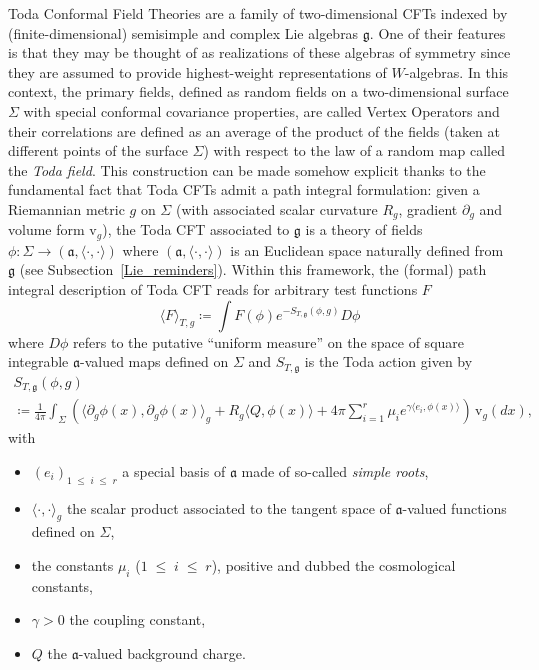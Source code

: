\documentclass[10pt]{amsart}
\theoremstyle{definition}\newtheorem{defi}[theo]{Definition}\newtheorem{rema}[theo]{Remark}\newtheorem{exam}[theo]{Example}\newtheorem{exem}[theo]{Example}\newtheorem{nota}[theo]{Notation}
\renewcommand{\leq}{\;\leqslant\;}
\newcommand{\frkg}{\mathfrak{g}}
\newcommand{\frka}{\mathfrak{a}}
\newcommand{\rmv}{\mathrm{v}}
\begin{document}
Toda Conformal Field Theories are a family of two-dimensional CFTs indexed by (finite-dimensional) semisimple and complex Lie algebras $\frkg$. One of their features is that they may be thought of as realizations of these algebras of symmetry since they are assumed to provide highest-weight representations of $W$-algebras. In this context, the primary fields, defined as random fields on a two-dimensional surface $\Sigma$ with special conformal covariance properties, are called Vertex Operators and their correlations are defined as an average of the product of the fields (taken at different points of the surface $\Sigma$) with respect to the law of a random map called the \emph{Toda field}. This construction can be made somehow explicit thanks to the fundamental fact that Toda CFTs admit a path integral formulation: given a Riemannian metric $g$ on $\Sigma$ (with associated scalar curvature $R_g$, gradient $\partial_g$ and volume form $\rmv_g$), the Toda CFT associated to $\frkg$ is a theory of fields $\phi:\Sigma\to (\frka,\langle \cdot, \cdot \rangle)$ where $(\frka,\langle \cdot, \cdot \rangle)$ is an Euclidean space naturally defined from $\frkg$ (see Subsection~\ref{Lie_reminders}). Within this framework, the (formal) path integral description of Toda CFT reads for arbitrary test functions $F$
\begin{equation}\label{partition_function}
\langle F \rangle_{T,g} \coloneqq \int F(\phi)e^{-S_{T,\frkg}(\phi,g)}D \phi
\end{equation}
where $D \phi$ refers to the putative ``uniform measure'' on the space of square integrable $\frka$-valued maps defined on $\Sigma$ and $ S_{T,\frkg}$ is the Toda action given by
\begin{multline}\label{action}
S_{T,\frkg}(\phi,g)\\
\coloneqq \frac{1}{4\pi} \int_{\Sigma} \left (\langle\partial_g \phi(x), \partial_g \phi(x) \rangle_g +R_g \langle Q, \phi(x) \rangle +4\pi \sum_{i=1}^{r} \mu_ie^{\gamma \langle e_i,\phi(x) \rangle} \right)\,\rmv_{g}(dx),
\end{multline}
with
\begin{itemize}
\item $(e_i)_{1\leq i\leq r}$ a special basis of $\frka$ made of so-called \emph{simple roots},
\item $\langle \cdot, \cdot \rangle_g$ the scalar product associated to the tangent space of $\frka$-valued functions defined on $\Sigma$,
\item the constants $\mu_i$ ($1\leq i\leq r$), positive and dubbed the cosmological constants,
\item $\gamma>0$ the coupling constant,
\item $Q$ the $\frka$-valued background charge.
\end{itemize}
\end{document}
